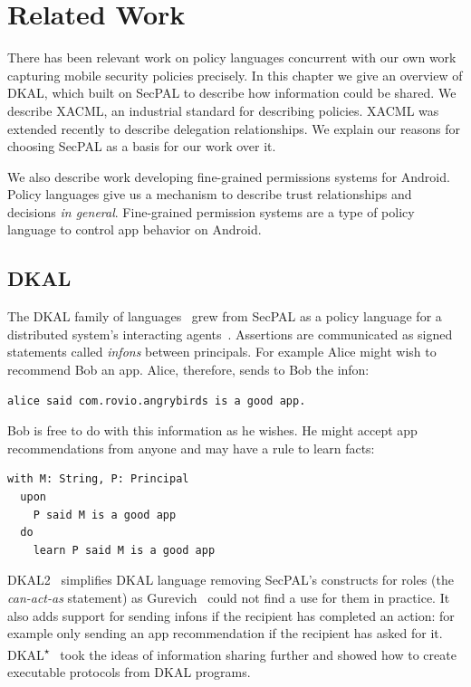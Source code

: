 \documentclass[thesis.tex]{subfiles}
\begin{document}
\chapter{Related Work}
\label{chap:related-work}
   
There has been relevant work on policy languages concurrent with our
own work capturing mobile security policies precisely. In this chapter
we give an overview of DKAL, which built on SecPAL to describe how
information could be shared. We describe XACML, an industrial standard
for describing policies.  XACML was extended recently to describe
delegation relationships. We explain our reasons for choosing SecPAL
as a basis for our work over it.

We also describe work developing fine-grained permissions systems for
Android.  Policy languages give us a mechanism to describe trust
relationships and decisions \emph{in general}. Fine-grained permission
systems are a type of policy language to control app behavior on
Android. 

\section{DKAL}

The DKAL family of
languages~\cite{jeannin_dkal*:_2013,gurevich_dkal:_2008,yuri_gurevich_dkal2---simplified_2009}
grew from SecPAL as a policy language for a distributed system's
interacting agents~\cite{blass_introduction_2012}. Assertions are
communicated as signed statements called \emph{infons} between
principals. For example Alice might wish to recommend Bob an
app. Alice, therefore, sends to Bob the infon:

\begin{lstlisting}
alice said com.rovio.angrybirds is a good app.
\end{lstlisting}

Bob is free to do with this information as he wishes. He might accept
app recommendations from anyone and may have a rule to learn facts:

\noindent\begin{minipage}{\textwidth}
\begin{lstlisting}
with M: String, P: Principal
  upon
    P said M is a good app
  do
    learn P said M is a good app
\end{lstlisting}
\end{minipage}

DKAL2~\cite{yuri_gurevich_dkal2---simplified_2009} simplifies DKAL
language removing SecPAL's constructs for roles (the \emph{can-act-as} statement)
as Gurevich~\etal{} could not find a use for them in practice.  It also adds
support for sending infons if the recipient has completed an action:
for example only sending an app recommendation if the recipient has
asked for it.
DKAL\textsuperscript{$\star$}~\cite{jeannin_dkal*:_2013} took the ideas of information sharing
further and showed how to create executable protocols from DKAL programs.
\end{document}
